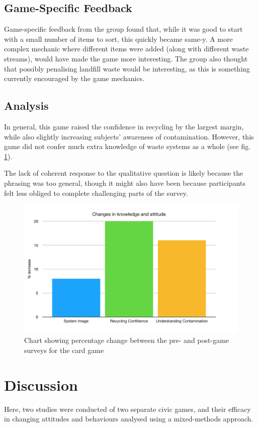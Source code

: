 \documentclass[nofonts,nols,justified,nobib]{tufte-book}
\begin{document}
\subsection*{Game-Specific Feedback}
Game-specific feedback from the group found that, while it was good to start with a small number of items to sort, this quickly became same-y. A more complex mechanic where different items were added (along with different waste streams), would have made the game more interesting. The group also thought that possibly penalising landfill waste would be interesting, as this is something currently encouraged by the game mechanics. 

\subsection*{Analysis} 
In general, this game raised the confidence in recycling by the largest margin, while also slightly increasing subjects' awareness of contamination. However, this game did not confer much extra knowledge of waste systems as a whole (see fig. \ref{comparison2}).

The lack of coherent response to the qualitative question is likely because the phrasing was too general, though it might also have been because participants felt less obliged to complete challenging parts of the survey. 


\begin{figure}
  \label{comparison2}
  \caption{Chart showing percentage change between the pre- and post-game surveys for the card game}
  \includegraphics[width=1\linewidth]{img/4/attitude-changes-llk.png}
\end{figure}

\newpage

\section*{Discussion}
Here, two studies were conducted of two separate civic games, and their efficacy in changing attitudes and behaviours analysed using a mixed-methods approach.
\end{document}

